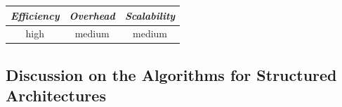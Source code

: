 \begin{center}
\begin{tabular}{ccc}
\emph{Efficiency} & \emph{Overhead} & \emph{Scalability} \\
\hline
high &
medium &
medium
\end{tabular}
\end{center}

\subsection{Discussion on the Algorithms for Structured Architectures}

